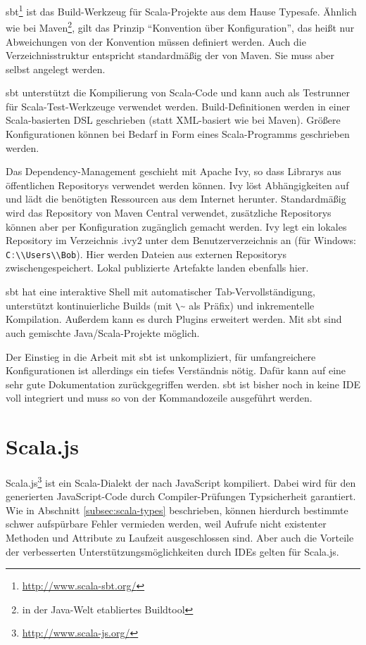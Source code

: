\documentclass[a4paper, 12pt, hidelinks, listof=totoc, listoftables=totoc, bibliography=totoc]{scrreprt}
\newcommand{\code}[1]{\lstinline[language=Scala, style=inline]|#1|}
\begin{document}
sbt\footnote{\url{http://www.scala-sbt.org/}} ist das Build-Werkzeug für Scala-Projekte aus dem Hause Typesafe.
Ähnlich wie bei Maven\footnote{in der Java-Welt etabliertes Buildtool}, gilt das Prinzip "`Konvention über Konfiguration"', das heißt nur Abweichungen von der Konvention müssen definiert werden. Auch die Verzeichnisstruktur entspricht standardmäßig der von Maven. Sie muss aber selbst angelegt werden.

sbt unterstützt die Kompilierung von Scala-Code und kann auch als Testrunner für Scala-Test-Werkzeuge verwendet werden.
Build-Definitionen werden in einer Scala-basierten \ac{DSL} geschrieben (statt \ac{XML}-basiert wie bei Maven). Größere Konfigurationen können bei Bedarf in Form eines Scala-Programms geschrieben werden.

Das Dependency-Management geschieht mit Apache Ivy, so dass Librarys aus öffentlichen Repositorys verwendet werden können. Ivy löst Abhängigkeiten auf und lädt die benötigten Ressourcen aus dem Internet herunter. Standardmäßig wird das Repository von Maven Central verwendet, zusätzliche Repositorys können aber per Konfiguration zugänglich gemacht werden. Ivy legt ein lokales Repository im Verzeichnis .ivy2 unter dem Benutzerverzeichnis an (für Windows: \code{C:\\Users\\Bob}). Hier werden Dateien aus externen Repositorys zwischengespeichert. Lokal publizierte Artefakte landen ebenfalls hier.

sbt hat eine interaktive Shell mit automatischer Tab-Vervollständigung, unterstützt kontinuierliche Builds (mit \code{\~} als Präfix) und inkrementelle Kompilation. Außerdem kann es durch Plugins erweitert werden. Mit sbt sind auch gemischte Java/Scala-Projekte möglich.

Der Einstieg in die Arbeit mit sbt ist unkompliziert, für umfangreichere Konfigurationen ist allerdings ein tiefes Verständnis nötig. Dafür kann auf eine sehr gute Dokumentation zurückgegriffen werden. sbt ist bisher noch in keine \ac{IDE} voll integriert und muss so von der Kommandozeile ausgeführt werden.


\chapter{Scala.js}\label{chap:scala.js}

Scala.js\footnote{\url{http://www.scala-js.org/}} ist ein Scala-Dialekt der nach JavaScript kompiliert\cite[S. 1]{doeraene2013.TDI}. Dabei wird für den generierten JavaScript-Code durch Compiler-Prüfungen Typsicherheit garantiert. Wie in Abschnitt \ref{subsec:scala-types} beschrieben, können hierdurch bestimmte schwer aufspürbare Fehler vermieden werden, weil Aufrufe nicht existenter Methoden und Attribute zu Laufzeit ausgeschlossen sind. Aber auch die Vorteile der verbesserten Unterstützungsmöglichkeiten durch \ac{IDE}s gelten für Scala.js.
\end{document}
